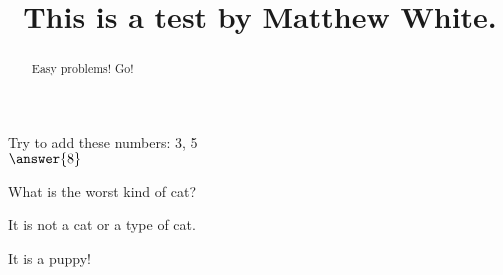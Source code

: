 \documentclass{ximera}
\title{This is a test by Matthew White.}
\begin{document}
	\begin{abstract}
		Easy problems! Go!
	\end{abstract}
	\maketitle
	
	
\begin{question}
	Try to add these numbers: 3, 5\\
	$\answer{8}$
\end{question}
	
\begin{question}
	What is the worst kind of cat?
	\begin{prompt}
		\begin{multipleChoice}
		\end{multipleChoice}
	\end{prompt}
	\begin{hint}
		It is not a cat or a type of cat.
	\end{hint}
	\begin{hint}
		It is a puppy!
	\end{hint}
\end{question}

	


	
\end{document}
